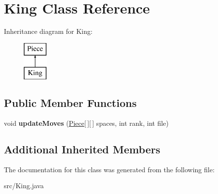 \hypertarget{class_king}{\section{King Class Reference}
\label{class_king}
}
Inheritance diagram for King\-:\begin{figure}[H]
\begin{center}
\leavevmode
\includegraphics[height=2.000000cm]{class_king}
\end{center}
\end{figure}
\subsection*{Public Member Functions}
\begin{DoxyCompactItemize}
\item 
\hypertarget{class_king_a9b6b029c60a7b8a16f7221fbbf1285c9}{void {\bfseries update\-Moves} (\hyperlink{class_piece}{Piece}\mbox{[}$\,$\mbox{]}\mbox{[}$\,$\mbox{]} spaces, int rank, int file)}\label{class_king_a9b6b029c60a7b8a16f7221fbbf1285c9}

\end{DoxyCompactItemize}
\subsection*{Additional Inherited Members}


The documentation for this class was generated from the following file\-:\begin{DoxyCompactItemize}
\item 
src/King.\-java\end{DoxyCompactItemize}
